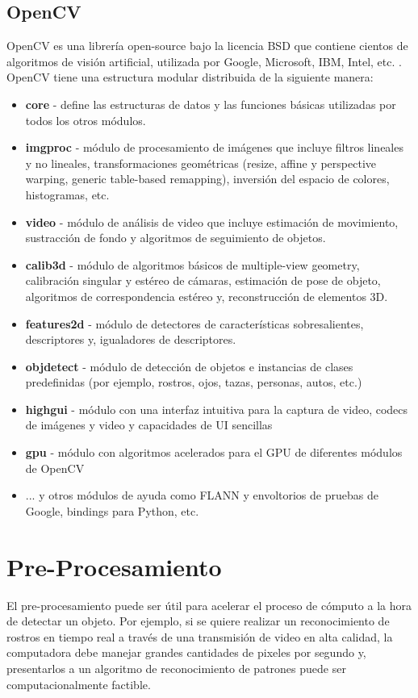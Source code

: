 \subsection{OpenCV}
OpenCV es una librería open-source bajo la licencia BSD que contiene cientos de algoritmos de visión artificial, utilizada por Google, Microsoft, IBM, Intel, etc. \cite{OpenCV2016-bv}. OpenCV tiene una estructura modular distribuida de la siguiente manera:
\begin{itemize}
\item \textbf{core} - define las estructuras de datos y las funciones básicas utilizadas por todos los otros módulos.
\item \textbf{imgproc} - módulo de procesamiento de imágenes que incluye filtros lineales y no lineales, transformaciones geométricas (resize, affine y perspective warping, generic table-based remapping), inversión del espacio de colores, histogramas, etc.
\item \textbf{video} - módulo de análisis de video que incluye estimación de movimiento, sustracción de fondo y algoritmos de seguimiento de objetos.
\item \textbf{calib3d} - módulo de algoritmos básicos de multiple-view geometry, calibración singular y estéreo de cámaras, estimación de pose de objeto, algoritmos de correspondencia estéreo y, reconstrucción de elementos 3D.
\item \textbf{features2d} - módulo de detectores de características sobresalientes, descriptores y, igualadores de descriptores.
\item \textbf{objdetect} - módulo de detección de objetos e instancias de clases predefinidas (por ejemplo, rostros, ojos, tazas, personas, autos, etc.)
\item \textbf{highgui} - módulo con una interfaz intuitiva para la captura de video, codecs de imágenes y video y capacidades de UI sencillas
\item \textbf{gpu} - módulo con algoritmos acelerados para el GPU de diferentes módulos de OpenCV
\item ... y otros módulos de ayuda como FLANN y envoltorios de pruebas de Google, bindings para Python, etc.    
\end{itemize}


\section{Pre-Procesamiento}
El pre-procesamiento puede ser útil para acelerar el proceso de cómputo a la hora de detectar un objeto. Por ejemplo, si se quiere realizar un reconocimiento de rostros en tiempo real a través de una transmisión de video en alta calidad, la computadora debe manejar grandes cantidades de pixeles por segundo y, presentarlos a un algoritmo de reconocimiento de patrones puede ser computacionalmente factible. 

